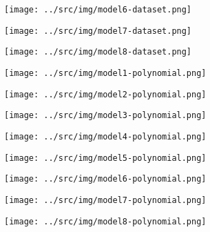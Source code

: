 \documentclass[12pt]{article}
\begin{document}
	\begin{figure}
		\centering
		\texttt{[image: ../src/img/model6-dataset.png]}
		\label{fig:model6-dataset}
	\end{figure}

	\begin{figure}
	\centering
	\texttt{[image: ../src/img/model7-dataset.png]}
	\label{fig:model7-dataset}
	\end{figure}

	\begin{figure}
		\centering
		\texttt{[image: ../src/img/model8-dataset.png]}
		\label{fig:model8-dataset}
	\end{figure}

		
	\begin{figure}
		\centering
		\texttt{[image: ../src/img/model1-polynomial.png]}
		\label{fig:model1-polynomial}
	\end{figure}
	
	\begin{figure}
		\centering
		\texttt{[image: ../src/img/model2-polynomial.png]}
		\label{fig:model2-polynomial}
	\end{figure}
	
	\begin{figure}
		\centering
		\texttt{[image: ../src/img/model3-polynomial.png]}
		\label{fig:model3-polynomial}
	\end{figure}
	
	\begin{figure}
		\centering
		\texttt{[image: ../src/img/model4-polynomial.png]}
		\label{fig:model4-polynomial}
	\end{figure}
	
	\begin{figure}
		\centering
		\texttt{[image: ../src/img/model5-polynomial.png]}
		\label{fig:model5-polynomial}
	\end{figure}
	
	\begin{figure}
		\centering
		\texttt{[image: ../src/img/model6-polynomial.png]}
		\label{fig:model6-polynomial}
	\end{figure}
	
	\begin{figure}
		\centering
		\texttt{[image: ../src/img/model7-polynomial.png]}
		\label{fig:model7-polynomial}
	\end{figure}
	
	\begin{figure}
		\centering
		\texttt{[image: ../src/img/model8-polynomial.png]}
		\label{fig:model8-polynomial}
	\end{figure}
	
	
\end{document}
